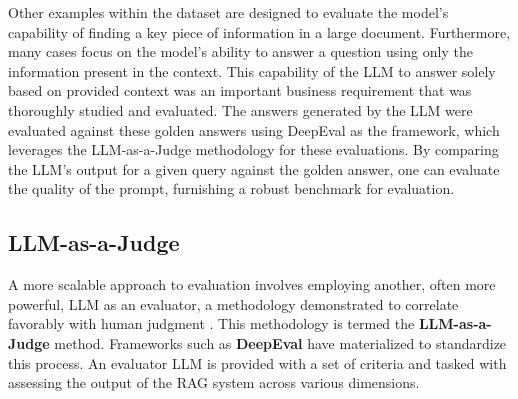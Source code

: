 Other examples within the dataset are designed to evaluate the model's capability of finding a key piece of information in a large document. Furthermore, many cases focus on the model's ability to answer a question using only the information present in the context. This capability of the LLM to answer solely based on provided context was an important business requirement that was thoroughly studied and evaluated. The answers generated by the LLM were evaluated against these golden answers using DeepEval as the framework, which leverages the LLM-as-a-Judge methodology for these evaluations. By comparing the LLM's output for a given query against the golden answer, one can evaluate the quality of the prompt, furnishing a robust benchmark for evaluation.

\subsection{LLM-as-a-Judge}
A more scalable approach to evaluation involves employing another, often more powerful, LLM as an evaluator, a methodology demonstrated to correlate favorably with human judgment \autocite{zheng2023judging}. This methodology is termed the \textbf{LLM-as-a-Judge} method. Frameworks such as \textbf{DeepEval} have materialized to standardize this process. An evaluator LLM is provided with a set of criteria and tasked with assessing the output of the RAG system across various dimensions.

